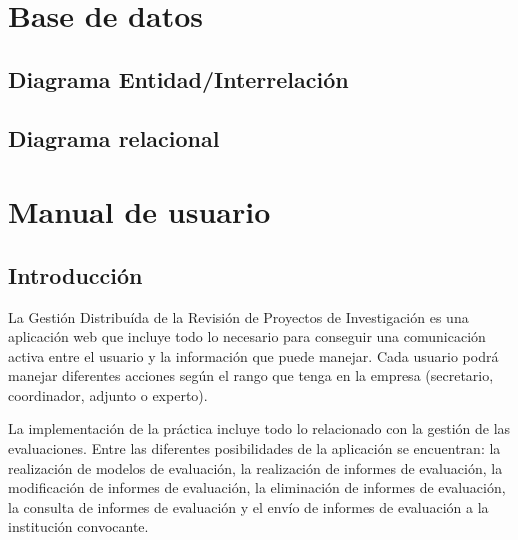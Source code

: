 \documentclass[12pt,a4paper,spanish,twoside]{book}
\begin{document}






\chapter{Base de datos}
\section{Diagrama Entidad/Interrelación}

\section{Diagrama relacional}

\chapter{Manual de usuario}
\section{Introducción}
La Gestión Distribuída de la Revisión de Proyectos de Investigación es una
aplicación web que incluye todo lo necesario para conseguir una comunicación 
activa entre el usuario y la información que puede manejar. Cada usuario podrá 
manejar diferentes acciones según el rango que tenga en la empresa (secretario,
coordinador, adjunto o experto).

La implementación de la práctica incluye todo lo relacionado con la gestión de
las evaluaciones. Entre las diferentes posibilidades de la aplicación se 
encuentran: la realización de modelos de evaluación, la realización de informes
de evaluación, la modificación de informes de evaluación, la eliminación de 
informes de evaluación, la consulta de informes de evaluación y el envío de 
informes de evaluación a la institución convocante.
\end{document}

